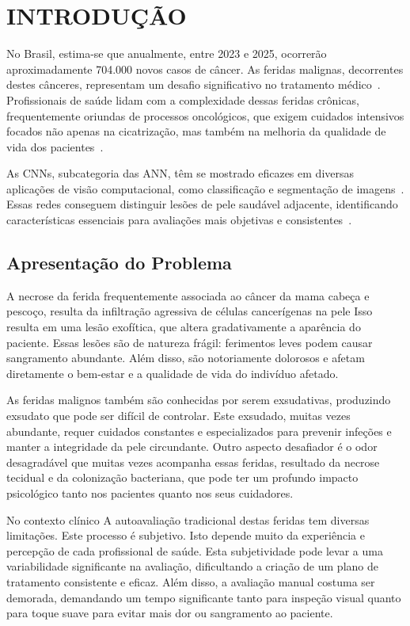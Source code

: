 \section{INTRODUÇÃO}
No Brasil, estima-se que anualmente, entre 2023 e 2025, ocorrerão aproximadamente 704.000 novos casos de câncer. As feridas malignas, decorrentes destes cânceres, representam um desafio significativo no tratamento médico~\cite{de2023estimativa}. Profissionais de saúde lidam com a complexidade dessas feridas crônicas, frequentemente oriundas de processos oncológicos, que exigem cuidados intensivos focados não apenas na cicatrização, mas também na melhoria da qualidade de vida dos pacientes~\cite{freitas2017intervenccoes, agra2017neoplastic}.

As \ac{CNNs}, subcategoria das \ac{ANN}, têm se mostrado eficazes em diversas aplicações de visão computacional, como classificação e segmentação de imagens~\cite{sun2023convolution}. Essas redes conseguem distinguir lesões de pele saudável adjacente, identificando características essenciais para avaliações mais objetivas e consistentes~\cite{litjens2017, lundervold2019, esteva2019}.

\subsection{Apresentação do Problema}

A necrose da ferida frequentemente associada ao câncer da mama cabeça e pescoço, resulta da infiltração agressiva de células cancerígenas na pele Isso resulta em uma lesão exofítica, que altera gradativamente a aparência do paciente. Essas lesões são de natureza frágil: ferimentos leves podem causar sangramento abundante. Além disso, são notoriamente dolorosos e afetam diretamente o bem-estar e a qualidade de vida do indivíduo afetado.

As feridas malignos também são conhecidas por serem exsudativas, produzindo exsudato que pode ser difícil de controlar. Este exsudado, muitas vezes abundante, requer cuidados constantes e especializados para prevenir infeções e manter a integridade da pele circundante. Outro aspecto desafiador é o odor desagradável que muitas vezes acompanha essas feridas, resultado da necrose tecidual e da colonização bacteriana, que pode ter um profundo impacto psicológico tanto nos pacientes quanto nos seus cuidadores.

No contexto clínico A autoavaliação tradicional destas feridas tem diversas limitações. Este processo é subjetivo. Isto depende muito da experiência e percepção de cada profissional de saúde. Esta subjetividade pode levar a uma variabilidade significante na avaliação, dificultando a criação de um plano de tratamento consistente e eficaz. Além disso, a avaliação manual costuma ser demorada, demandando um tempo significante tanto para inspeção visual quanto para toque suave para evitar mais dor ou sangramento ao paciente.


